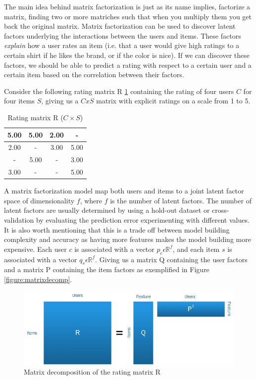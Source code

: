 The main idea behind matrix factorization is just as its name implies, factorize a matrix, finding two or more matriches such that when you multiply them you get back the original matrix. Matrix factorization can be used to discover latent factors underlying the interactions between the users and items. These factors \emph{explain} how a user rates an item (i.e. that a user would give high ratings to a certain shirt if he likes the brand, or if the color is nice). If we can discover these factors, we should be able to predict a rating with respect to a certain user and a certain item based on the correlation between their factors.

Consider the following rating matrix R \ref{table:RatingMatrix} containing the rating of four users $C$ for four items $S$, giving us a $CxS$ matrix with explicit ratings on a scale from 1 to 5.

\begin{table}[!htbp]
\centering
\begin{tabular}{|c|c|c|c|}
\hline
5.00 	& 5.00	& 2.00 & - 	  \\ \hline
2.00 	& -		& 3.00 & 5.00 \\ \hline
 - 		& 5.00	& -    & 3.00 \\ \hline
3.00	& - 	& -	   & 5.00 \\ \hline
\end{tabular}
\label{table:RatingMatrix}
\caption{Rating matrix R ($C \times S$)}
\end{table} 

A matrix factorization model map both users and items to a joint latent factor space of dimensionality $f$, where $f$ is the number of latent factors. The number of latent factors are usually determined by using a hold-out dataset or cross-validation by evaluating the prediction error experimenting with different values. It is also worth mentioning that this is a trade off between model building complexity and accuracy as having more features makes the model building more expensive. Each user $c$ is associated with a vector $p_{c} \epsilon \mathbb{R}^{f}$, and each item $s$ is associated with a vector $q_{s} \epsilon \mathbb{R}^{f}$. Giving us a matrix Q containing the user factors and a matrix P containing the item factors as exemplified in Figure \ref{figure:matrixdecomp}.

\begin{figure}[H]
    \includegraphics[width=5in]{image/matrixdecomp.jpg}
    \centering
    \caption[Matrix decomposition of the rating matrix R]{Matrix decomposition of the rating matrix R}
    \label{figure:ratingmatrix}
\end{figure}

